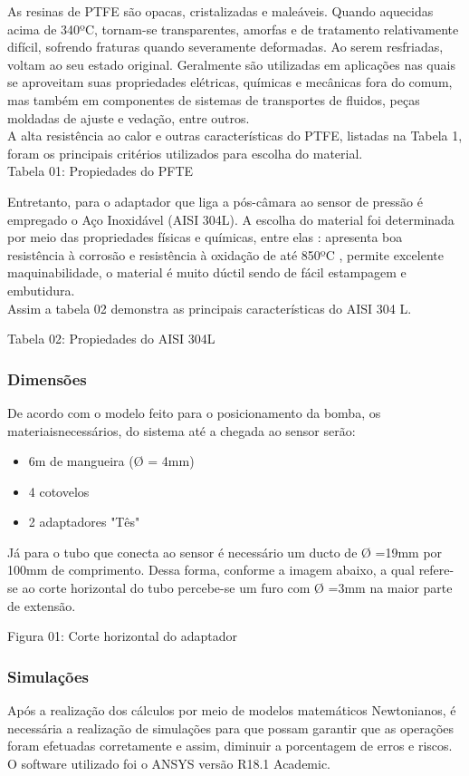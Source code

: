 As resinas de PTFE são opacas, cristalizadas e maleáveis. Quando aquecidas acima de 340ºC, tornam-se transparentes, amorfas e de tratamento relativamente difícil, sofrendo fraturas quando severamente deformadas. Ao serem resfriadas, voltam ao seu estado original. Geralmente são utilizadas em aplicações nas quais se aproveitam suas propriedades elétricas, químicas e mecânicas fora do comum, mas também em componentes de sistemas de transportes de fluidos, peças moldadas de ajuste e vedação, entre outros.\\

A alta resistência ao calor e outras características do PTFE, listadas na Tabela 1, foram os principais critérios utilizados para escolha do material.\\

\caption{Tabela 01: Propiedades do PFTE}

Entretanto, para o adaptador que liga a pós-câmara ao sensor de pressão é empregado o Aço Inoxidável (AISI 304L). A escolha do material foi determinada por meio das propriedades físicas e químicas, entre elas : apresenta boa resistência à corrosão e resistência à oxidação de até 850ºC , permite excelente maquinabilidade, o material é muito dúctil sendo de fácil estampagem e  embutidura.\\

Assim a tabela 02 demonstra as principais características do AISI 304 L.

\caption{Tabela 02: Propiedades do AISI 304L}
\subsubsection{Dimensões}
De acordo com o modelo feito para o posicionamento da bomba, os materiaisnecessários, do sistema até a chegada ao sensor serão:
\begin{itemize}
\item 6m de mangueira (Ø = 4mm)
\item 4 cotovelos
\item 2 adaptadores "Tês"
\end{itemize}

Já para o tubo que conecta ao sensor é necessário um ducto de Ø =19mm por 100mm de comprimento. Dessa forma, conforme a imagem abaixo, a qual refere-se ao corte horizontal do tubo percebe-se um furo com Ø =3mm na maior parte de extensão.

\caption{Figura 01: Corte horizontal do adaptador}

\subsubsection{Simulações}
Após a realização dos cálculos por meio de modelos matemáticos Newtonianos, é necessária a realização de simulações para que possam garantir que as operações foram efetuadas corretamente e assim, diminuir a porcentagem de erros e riscos. O software utilizado foi o ANSYS versão R18.1 Academic.\\

